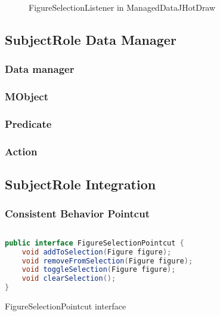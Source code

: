 \begin{figure}[H]
	\centering
  	\caption{FigureSelectionListener in ManagedDataJHotDraw}
  	\label{fig:JHotDraw_FigureSelectionListener_MD}
\end{figure}

\subsection{SubjectRole Data Manager}
\subsubsection{Data manager}
\subsubsection{MObject}
\subsubsection{Predicate}
\subsubsection{Action}

\subsection{SubjectRole Integration}
\subsubsection{Consistent Behavior Pointcut}

\begin{sourcecode} [H]
	\begin{lstlisting}[language=Java, escapechar=|]
public interface FigureSelectionPointcut {
	void addToSelection(Figure figure);
	void removeFromSelection(Figure figure);
	void toggleSelection(Figure figure);
	void clearSelection();
}
	\end{lstlisting}
	\caption{FigureSelectionPointcut interface}
	\label{lst:FigureSelectionPointcut}
\end{sourcecode}

